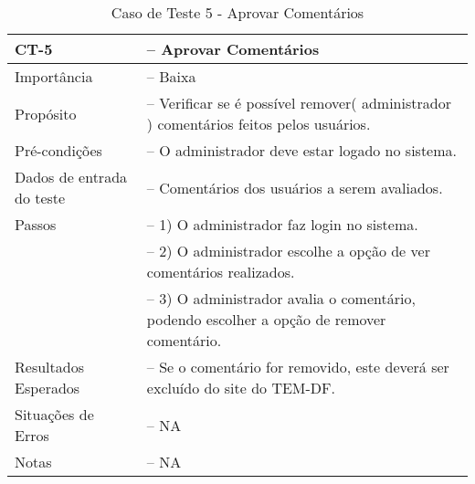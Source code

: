 \begin{anexosenv}
\begin{longtable}{p{4cm}>{-- }p{9cm}}
  \caption{Caso de Teste 5 - Aprovar Comentários}\label{tab:ct5} \\
  \toprule
  \noindent
  CT-5                      & Aprovar Comentários\\ \midrule
  Importância               & Baixa\\ \midrule
  Propósito                 & Verificar se é possível remover( administrador ) comentários feitos pelos usuários.\\ \midrule
  Pré-condições             & O administrador deve estar logado no sistema.\\ \midrule
  Dados de entrada do teste & Comentários dos usuários a serem avaliados.\\ \midrule
  Passos                    & 1) O administrador faz login no sistema.\\
                            & 2) O administrador escolhe a opção de ver comentários realizados.\\
                            & 3) O administrador avalia o comentário, podendo escolher a opção de remover comentário.\\ \midrule
  Resultados Esperados      & Se o comentário for removido, este deverá ser excluído do site do TEM-DF.\\ \midrule
  Situações de Erros        & NA\\ \midrule
  Notas                     & NA                              \\ \bottomrule
\end{longtable}

\end{anexosenv}
